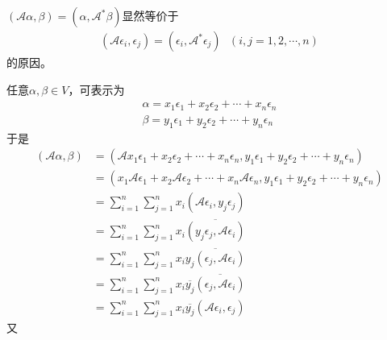 \documentclass{article}
\begin{document}
\begin{zremark}
  $(\mathscr{A}\alpha, \beta) = (\alpha, \mathscr{A}^*\beta)$显然等价于
  \begin{align*}
    (\mathscr{A}\epsilon_i, \epsilon_j) = (\epsilon_i, \mathscr{A}^*\epsilon_j) \ \ \ (i, j = 1, 2, \cdots, n)
  \end{align*}
  的原因。
\end{zremark}
任意$\alpha, \beta \in V$，可表示为
\begin{align*}
  \alpha = x_1 \epsilon_1 + x_2 \epsilon_2 + \cdots + x_n \epsilon_n \\
  \beta = y_1 \epsilon_1 + y_2 \epsilon_2 + \cdots + y_n \epsilon_n
\end{align*}
于是
\begin{align*}
  (\mathscr{A}\alpha, \beta)
   & = (\mathscr{A} x_1 \epsilon_1 + x_2 \epsilon_2 + \cdots + x_n \epsilon_n, y_1 \epsilon_1 + y_2 \epsilon_2 + \cdots + y_n \epsilon_n)                       \\
   & = (x_1 \mathscr{A} \epsilon_1 + x_2 \mathscr{A}\epsilon_2 + \cdots + x_n \mathscr{A}\epsilon_n, y_1 \epsilon_1 + y_2 \epsilon_2 + \cdots + y_n \epsilon_n) \\
   & = \sum \limits_{i = 1}^n \sum \limits_{j = 1}^n x_i (\mathscr{A} \epsilon_i, y_j \epsilon_j)                                                               \\
   & = \sum \limits_{i = 1}^n \sum \limits_{j = 1}^n x_i \overline{(y_j \epsilon_j, \mathscr{A} \epsilon_i)}                                                    \\
   & = \sum \limits_{i = 1}^n \sum \limits_{j = 1}^n x_i \overline{y_j (\epsilon_j, \mathscr{A} \epsilon_i)}                                                    \\
   & = \sum \limits_{i = 1}^n \sum \limits_{j = 1}^n x_i \overline{y_j}\overline{(\epsilon_j, \mathscr{A} \epsilon_i)}                                          \\
   & = \sum \limits_{i = 1}^n \sum \limits_{j = 1}^n x_i \overline{y_j}(\mathscr{A} \epsilon_i, \epsilon_j)
\end{align*}
又
\end{document}
